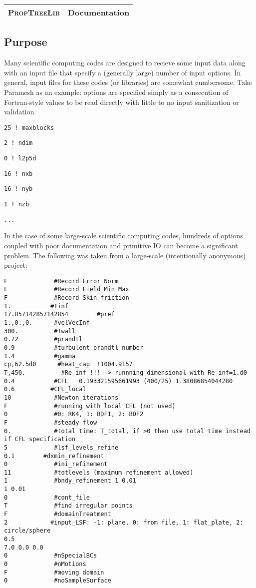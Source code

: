 \documentclass[10pt]{article}
\begin{document}
\begin{center}
\begin{tabular}{l r}
\Large{\textsc{PropTreeLib}}\hspace{100mm} & \textbf{Documentation}\\\hline
\end{tabular}
\end{center}
\vspace{2mm}

\subsection*{Purpose}
Many scientific computing codes are designed to recieve some input data along with an input file that specify a (generally large) number of input options. In general, input files for these codes (or libraries) are somewhat cumbersome. Take Paramesh as an example: options are specified simply as a consecution of Fortran-style values to be read directly with little to no input sanitization or validation. 

\begin{center}
\texttt{25 ! maxblocks}

\texttt{2  ! ndim}

\texttt{0 ! l2p5d}

\texttt{16 ! nxb}

\texttt{16 ! nyb}

\texttt{1  ! nzb}

\texttt{...}
\end{center}

In the case of some large-scale scientific computing codes, hundreds of options coupled with poor documentation and primitive IO can become a significant problem. The following was taken from a large-scale (intentionally anonymous) project:

\begin{center}
\begin{verbatim}
F             #Record Error Norm
F             #Record Field Min Max
F             #Record Skin friction
1.           #Tinf
17.857142857142854        #pref
1.,0.,0.      #velVecInf
300.          #Twall
0.72          #prandtl
0.9           #turbulent prandtl number
1.4           #gamma
cp,62.5d0      #heat_cap  !1004.9157 
T,450.          #Re_inf !!! -> runnning dimensional with Re_inf=1.d0
0.4           #CFL   0.193321595661993 (400/25) 1.38086854044280
0.6          #CFL_local
10            #Newton_iterations
F             #running with local CFL (not used)
0             #0: RK4, 1: BDF1, 2: BDF2
F             #steady flow
0.            #total time: T_total, if >0 then use total time instead if CFL specification
5             #lsf_levels_refine
0.1        #dxmin_refinement
0             #ini_refinement
11            #totlevels (maximum refinement allowed)
1             #bndy_refinement 1 0.01 
1 0.01
0             #cont_file
T             #find irregular points
F             #domainTreatment
2            #input_LSF: -1: plane, 0: from file, 1: flat_plate, 2: circle/sphere
0.5 
7.0 0.0 0.0
0             #nSpecialBCs
0	          #nMotions
F             #moving domain
0             #noSampleSurface
\end{verbatim}
\end{center}
\end{document}
